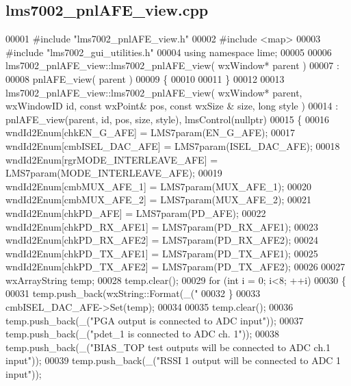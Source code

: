 \subsection{lms7002\+\_\+pnl\+A\+F\+E\+\_\+view.\+cpp}
\label{lms7002__pnlAFE__view_8cpp_source}

\begin{DoxyCode}
00001 \textcolor{preprocessor}{#include "lms7002_pnlAFE_view.h"}
00002 \textcolor{preprocessor}{#include <map>}
00003 \textcolor{preprocessor}{#include "lms7002_gui_utilities.h"}
00004 \textcolor{keyword}{using namespace }lime;
00005 
00006 lms7002_pnlAFE_view::lms7002_pnlAFE_view( wxWindow* parent )
00007 :
00008 pnlAFE_view( parent )
00009 \{
00010 
00011 \}
00012 
00013 lms7002_pnlAFE_view::lms7002_pnlAFE_view( wxWindow* parent, wxWindowID \textcolor{keywordtype}{id}, \textcolor{keyword}{const} wxPoint& pos, \textcolor{keyword}{const} wxSize
      & size, \textcolor{keywordtype}{long} style )
00014     : pnlAFE_view(parent, id, pos, size, style), lmsControl(nullptr)
00015 \{
00016     wndId2Enum[chkEN_G_AFE] = LMS7param(EN_G_AFE);
00017     wndId2Enum[cmbISEL_DAC_AFE] = LMS7param(ISEL_DAC_AFE);
00018     wndId2Enum[rgrMODE_INTERLEAVE_AFE] = LMS7param(MODE_INTERLEAVE_AFE);
00019     wndId2Enum[cmbMUX_AFE_1] = LMS7param(MUX_AFE_1);
00020     wndId2Enum[cmbMUX_AFE_2] = LMS7param(MUX_AFE_2);
00021     wndId2Enum[chkPD_AFE] = LMS7param(PD_AFE);
00022     wndId2Enum[chkPD_RX_AFE1] = LMS7param(PD_RX_AFE1);
00023     wndId2Enum[chkPD_RX_AFE2] = LMS7param(PD_RX_AFE2);
00024     wndId2Enum[chkPD_TX_AFE1] = LMS7param(PD_TX_AFE1);
00025     wndId2Enum[chkPD_TX_AFE2] = LMS7param(PD_TX_AFE2);
00026 
00027     wxArrayString temp;
00028     temp.clear();
00029     \textcolor{keywordflow}{for} (\textcolor{keywordtype}{int} i = 0; i<8; ++i)
00030     \{
00031         temp.push\_back(wxString::Format(\_(\textcolor{stringliteral}{"%
00032     \}
00033     cmbISEL_DAC_AFE->Set(temp);
00034 
00035     temp.clear();
00036     temp.push\_back(\_(\textcolor{stringliteral}{"PGA output is connected to ADC input"}));
00037     temp.push\_back(\_(\textcolor{stringliteral}{"pdet\_1 is connected to ADC ch. 1"}));
00038     temp.push\_back(\_(\textcolor{stringliteral}{"BIAS\_TOP test outputs will be connected to ADC ch.1 input"}));
00039     temp.push\_back(\_(\textcolor{stringliteral}{"RSSI 1 output will be connected to ADC 1 input"}));
}
\end{DoxyCode}
